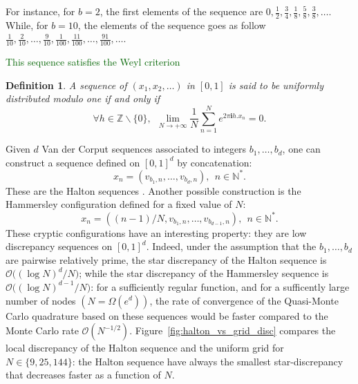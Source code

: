\documentclass[twoside,11pt]{book}
\newcommand{\rev}[1]{\textcolor{darkgreen}{#1}}
\newtheorem{definition}{Definition}
\numberwithin{theorem}{chapter}
\numberwithin{definition}{chapter}
\numberwithin{proposition}{chapter}
\numberwithin{corollary}{chapter}
\numberwithin{example}{chapter}
\numberwithin{lemma}{chapter}
\begin{document}

For instance, for $b = 2$, the first elements of the sequence are $\displaystyle 0, \frac{1}{2}, \frac{3}{4}, \frac{1}{8}, \frac{5}{8}, \frac{3}{8}, \dots$. While, for $b=10$, the elements of the sequence goes as follow $\displaystyle \frac{1}{10}, \frac{2}{10}, \dots, \frac{9}{10}, \frac{1}{100}, \frac{11}{100}, \dots ,\frac{91}{100}, \dots$.

\rev{This sequence satisfies the Weyl criterion }
\begin{definition}
A sequence of $(x_{1}, x_{2}, \dots)$ in $[0,1]$ is said to be \emph{uniformly distributed modulo one} if and only if
\begin{equation}
\forall h \in \mathbb{Z} \smallsetminus \{0\}, \:\: \lim\limits_{N \rightarrow +\infty} \frac{1}{N} \sum\limits_{n =1}^{N} e^{2 \pi \mathbf{i} h . x_{n}} = 0.
\end{equation}
\end{definition}

Given $d$ Van der Corput sequences associated to integers $b_{1}, \dots , b_{d}$, one can construct a sequence defined on $[0,1]^{d}$ by concatenation:
\begin{equation}
x_{n} = (v_{b_1,n}, \dots, v_{b_d,n}), \:\: n \in \mathbb{N}^{*}.
\end{equation}
These are the Halton sequences \citep{Hal64}. Another possible construction is the Hammersley configuration defined for a fixed value of $N$:
\begin{equation}
x_{n} = ((n-1)/N,v_{b_1,n}, \dots, v_{b_{d-1},n}), \:\: n \in \mathbb{N}^{*}.
\end{equation}
These cryptic configurations have an interesting property: they are low discrepancy sequences on $[0,1]^{d}$. Indeed, under the assumption that the $b_{1}, \dots, b_{d}$ are pairwise relatively prime, the star discrepancy of the Halton sequence is $\displaystyle \mathcal{O}\big((\log N)^{d}/N \big)$; while the star discrepancy of the Hammersley sequence is $\displaystyle \mathcal{O} \big((\log N)^{d-1}/N \big)$: for a sufficiently regular function, and for a sufficently large number of nodes $(N = \Omega(e^{d}))$, the rate of convergence of the Quasi-Monte Carlo quadrature based on these sequences would be faster compared to the Monte Carlo rate $\mathcal{O}(N^{-1/2})$. Figure~\ref{fig:halton_vs_grid_disc} compares the local discrepancy of the Halton sequence and the uniform grid for $N \in \{9,25,144\}$: the Halton sequence have always the smallest star-discrepancy that decreases faster as a function of $N$. 
\end{document}

